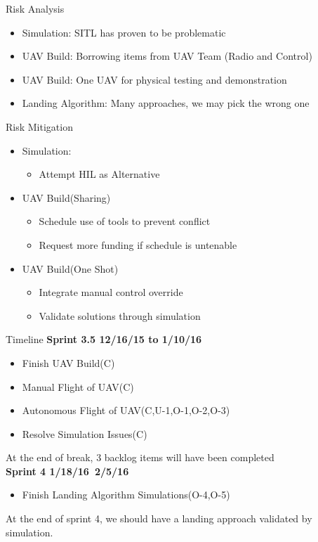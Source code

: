 \documentclass[11pt]{beamer}
\begin{document}
\begin{frame}{Risk Analysis}
\begin{itemize}
\item Simulation: SITL has proven to be problematic
\item UAV Build: Borrowing items from UAV Team (Radio and Control)
\item UAV Build: One UAV for physical testing and demonstration
\item Landing Algorithm: Many approaches, we may pick the wrong one
\end{itemize}


\end{frame}

\begin{frame}{Risk Mitigation}
\begin{itemize}
\item Simulation:
\begin{itemize}
\item Attempt HIL as Alternative
\end{itemize}

\item UAV Build(Sharing)
\begin{itemize}
\item Schedule use of tools to prevent conflict
\item Request more funding if schedule is untenable
\end{itemize}

\item UAV Build(One Shot)
\begin{itemize}
\item Integrate manual control override
\item Validate solutions through simulation
\end{itemize}

\end{itemize}
\end{frame}


\begin{frame}{Timeline}
\textbf{Sprint 3.5 12/16/15 to 1/10/16}
\begin{itemize}
\item Finish UAV Build(C)
\item Manual Flight of UAV(C)
\item Autonomous Flight of UAV(C,U-1,O-1,O-2,O-3)
\item Resolve Simulation Issues(C)
\end{itemize}
\vspace{2mm}
At the end of break, 3 backlog items will have been completed\\
\vspace{4mm}
\textbf{Sprint 4 1/18/16~2/5/16}
\begin{itemize}
\item Finish Landing Algorithm Simulations(O-4,O-5)
\end{itemize}
\vspace{2mm}
At the end of sprint 4, we should have a landing approach validated by simulation.
\end{frame}
\end{document}
